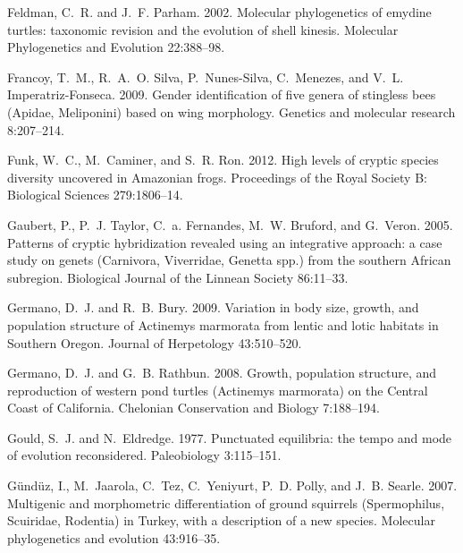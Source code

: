 \documentclass[12pt,letterpaper]{article}
\begin{document}
\begin{thebibliography}{77}
    Feldman, C.~R. and J.~F. Parham. 2002. {Molecular phylogenetics of emydine
    turtles: taxonomic revision and the evolution of shell kinesis.} Molecular
    Phylogenetics and Evolution 22:388--98.

    Francoy, T.~M., R.~A.~O. Silva, P.~Nunes-Silva, C.~Menezes, and V.~L.
    Imperatriz-Fonseca. 2009. {Gender identification of five genera of stingless
    bees (Apidae, Meliponini) based on wing morphology}. Genetics and molecular
    research 8:207--214.

    Funk, W.~C., M.~Caminer, and S.~R. Ron. 2012. {High levels of cryptic species
    diversity uncovered in Amazonian frogs.} Proceedings of the Royal Society B:
    Biological Sciences 279:1806--14.

    Gaubert, P., P.~J. Taylor, C.~a. Fernandes, M.~W. Bruford, and G.~Veron. 2005.
    {Patterns of cryptic hybridization revealed using an integrative approach: a
      case study on genets (Carnivora, Viverridae, Genetta spp.) from the southern
    African subregion}. Biological Journal of the Linnean Society 86:11--33.

    Germano, D.~J. and R.~B. Bury. 2009. {Variation in body size, growth, and
      population structure of Actinemys marmorata from lentic and lotic habitats in
    Southern Oregon}. Journal of Herpetology 43:510--520.

    Germano, D.~J. and G.~B. Rathbun. 2008. {Growth, population structure, and
      reproduction of western pond turtles (Actinemys marmorata) on the Central
    Coast of California}. Chelonian Conservation and Biology 7:188--194.

    Gould, S.~J. and N.~Eldredge. 1977. {Punctuated equilibria: the tempo and mode
    of evolution reconsidered}. Paleobiology 3:115--151.

    G\"{u}nd\"{u}z, I., M.~Jaarola, C.~Tez, C.~Yeniyurt, P.~D. Polly, and J.~B.
    Searle. 2007. {Multigenic and morphometric differentiation of ground
      squirrels (Spermophilus, Scuiridae, Rodentia) in Turkey, with a description
    of a new species.} Molecular phylogenetics and evolution 43:916--35.


\end{thebibliography}
\end{document}
